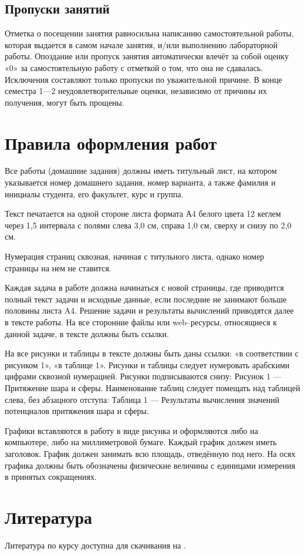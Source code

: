 \documentclass[11pt, a4paper]{article}
\theoremstyle{plain}
\theoremstyle{definition}
\theoremstyle{remark}
\begin{document}
\subsection{Пропуски занятий}
Отметка о посещении занятия равносильна написанию самостоятельной работы, которая
выдается в самом начале занятия, и/или выполнению лабораторной работы. Опоздание или
пропуск занятия автоматически влечёт за собой оценку «0» за самостоятельную работу с отметкой
о том, что она не сдавалась. Исключения составляют только пропуски по уважительной причине.
В конце семестра 1—2 неудовлетворительные оценки, независимо от причины их получения, могут
быть прощены.

\section{Правила оформления работ}
Все работы (домашние задания) должны иметь титульный лист, на котором указывается номер домашнего задания, номер варианта, а также фамилия и инициалы студента, его факультет, курс и группа.

Текст печатается на одной стороне листа формата А4 белого цвета 12 кеглем через 1,5 интервала с полями слева 3,0 см, справа 1,0 см, сверху и снизу по 2,0 см.

Нумерация страниц сквозная, начиная с титульного листа, однако номер страницы на нем не ставится.

Каждая задача в работе должна начинаться с новой страницы, где приводится полный текст задачи и исходные данные, если последние не занимают больше половины листа A4. Решение
задачи и результаты вычислений приводятся далее в тексте работы. На все сторонние файлы или
web–ресурсы, относящиеся к данной задаче, в тексте должны быть ссылки.

На все рисунки и таблицы в тексте должны быть даны ссылки: «в соответствии с рисунком 1», «в таблице 1». Рисунки и таблицы следует нумеровать арабскими цифрами сквозной
нумерацией. Рисунки подписываются снизу: Рисунок 1 — Притяжение шара и сферы. Наименование таблиц следует помещать над таблицей слева, без абзацного отступа: Таблица 1 — Результаты вычисления значений потенциалов притяжения шара и сферы.

Графики вставляются в работу в виде рисунка и оформляются либо на компьютере, либо на
миллиметровой бумаге. Каждый график должен иметь заголовок. График должен занимать всю
площадь, отведённую под него. На осях графика должны быть обозначены физические величины
с единицами измерения в принятых сокращениях.

\section{Литература}
Литература по курсу доступна для скачивания на .
\begin{refsection}
    \nocite{Shimbirev1975, Ogorodova2013,Yuzefovich1980, Serkerov1999, Yuzefovich2014, Torge1999}
    \printbibliography[heading=none]
\end{refsection}
\end{document}
